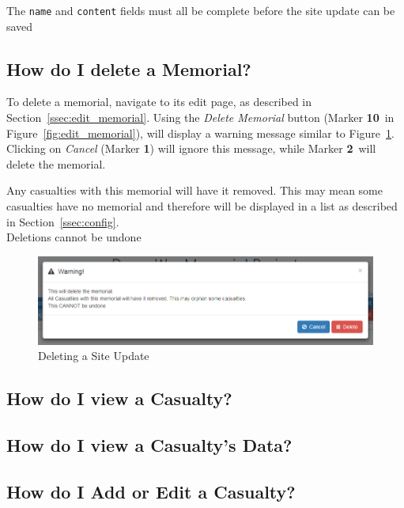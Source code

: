 \documentclass[12pt]{article}
\newcommand{\marker}[1]{Marker \color{red}\textbf{#1}\color{black}}
\begin{document}
\begin{infoBox}
The \texttt{name} and \texttt{content} fields must all be complete before the site update can be saved
\end{infoBox}

\FloatBarrier
\subsection{How do I delete a Memorial?}\label{ssec:delete_memorial}
To delete a memorial, navigate to its edit page, as described in Section~\ref{ssec:edit_memorial}. Using the \textit{Delete Memorial} button (\marker{10}\ in Figure~\ref{fig:edit_memorial}), will display a warning message similar to Figure~\ref{fig:delete_memorial}. Clicking on \textit{Cancel} (\marker{1}) will ignore this message, while \marker{2}\ will delete the memorial.

\begin{warningBox}
Any casualties with this memorial will have it removed. This may mean some casualties have no memorial and therefore will be displayed in a list as described in Section~\ref{ssec:config}.\\
Deletions cannot be undone
\end{warningBox}

\begin{figure}[h]
  \centering
 \includegraphics[width=.9\textwidth]{pics/delete_memorial.png}
	\caption{Deleting a Site Update}\label{fig:delete_memorial}
\end{figure}

\newpage
\FloatBarrier
\subsection{How do I view a Casualty?}
\subsection{How do I view a Casualty's Data?}
\subsection{How do I Add or Edit a Casualty?}
\end{document}
